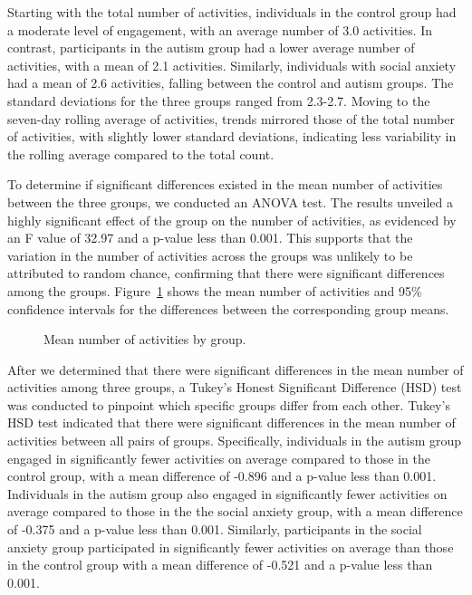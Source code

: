 \documentclass[
  letterpaper,
  number,
  review,
  3p]{elsarticle}
\begin{document}
Starting with the total number of activities, individuals in the control
group had a moderate level of engagement, with an average number of 3.0
activities. In contrast, participants in the autism group had a lower
average number of activities, with a mean of 2.1 activities. Similarly,
individuals with social anxiety had a mean of 2.6 activities, falling
between the control and autism groups. The standard deviations for the
three groups ranged from 2.3-2.7. Moving to the seven-day rolling
average of activities, trends mirrored those of the total number of
activities, with slightly lower standard deviations, indicating less
variability in the rolling average compared to the total count.

To determine if significant differences existed in the mean number of
activities between the three groups, we conducted an ANOVA test. The
results unveiled a highly significant effect of the group on the number
of activities, as evidenced by an F value of 32.97 and a p-value less
than 0.001. This supports that the variation in the number of activities
across the groups was unlikely to be attributed to random chance,
confirming that there were significant differences among the groups.
Figure~\ref{fig-ANOVAActs} shows the mean number of activities and 95\%
confidence intervals for the differences between the corresponding group
means.

\begin{figure}[H]


\caption{\label{fig-ANOVAActs}Mean number of activities by group.}

\end{figure}%

After we determined that there were significant differences in the mean
number of activities among three groups, a Tukey's Honest Significant
Difference (HSD) test was conducted to pinpoint which specific groups
differ from each other. Tukey's HSD test indicated that there were
significant differences in the mean number of activities between all
pairs of groups. Specifically, individuals in the autism group engaged
in significantly fewer activities on average compared to those in the
control group, with a mean difference of -0.896 and a p-value less than
0.001. Individuals in the autism group also engaged in significantly
fewer activities on average compared to those in the the social anxiety
group, with a mean difference of -0.375 and a p-value less than 0.001.
Similarly, participants in the social anxiety group participated in
significantly fewer activities on average than those in the control
group with a mean difference of -0.521 and a p-value less than 0.001.
\end{document}
